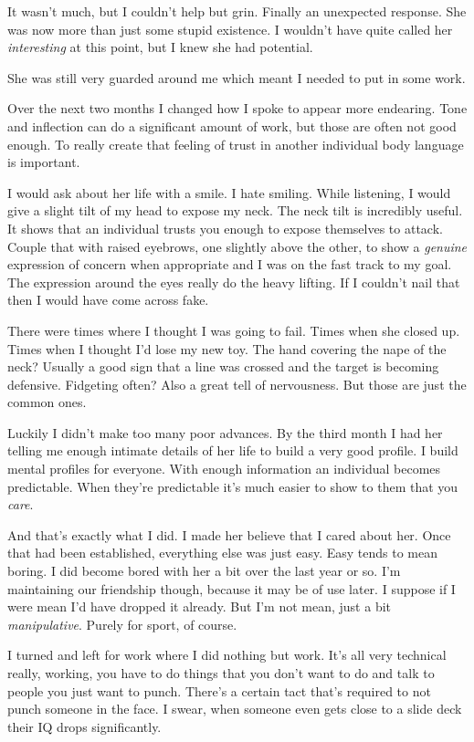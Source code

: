 \noindent
It wasn't much, but I couldn't help but grin.  Finally an unexpected response.
She was now more than just some stupid existence.
I wouldn't have quite called her \textit{interesting} at this point,
but I knew she had potential.
\VV


\noindent
She was still very guarded around me which meant I needed to put in some work.
\VV


\noindent
Over the next two months I changed how I spoke to appear more endearing.
Tone and inflection can do a significant amount of work, but those are often
not good enough.  To really create that feeling of trust in another individual
body language is important.


I would ask about her life with a smile.  I hate smiling.  While listening,
I would give a slight tilt of my head to expose my neck.  The neck tilt is
incredibly useful.  It shows that an individual trusts you enough to
expose themselves to attack. Couple that with raised eyebrows,
one slightly above the other, to show a \textit{genuine} expression of
concern when appropriate and I was on the fast track to my goal.
The expression around the eyes really do the heavy lifting.
If I couldn't nail that then I would have come across fake.


There were times where I thought I was going to fail.  Times when she
closed up.  Times when I thought I'd lose my new toy.
The hand covering the nape of the neck?  Usually a good sign
that a line was crossed and the target is becoming defensive.
Fidgeting often? Also a great tell of nervousness.
But those are just the common ones.


Luckily I didn't make too many poor advances.  By the third month I had her
telling me enough intimate details of her life to build a very good profile.
I build mental profiles for everyone. With enough information
an individual becomes predictable. When they're predictable it's much
easier to show to them that you \textit{care}.


And that's exactly what I did.  I made her believe that I cared about her.
Once that had been established, everything else was just easy.  Easy tends
to mean boring.  I did become bored with her a bit over the last year or so.
I'm maintaining our friendship though, because it may be of use later.
I suppose if I were mean I'd have dropped it already.  But I'm not mean,
just a bit \textit{manipulative}.  Purely for sport, of course.
\VV


\noindent
I turned and left for work where I did nothing but work.
It's all very technical really, working, you have to do
things that you don't want to do and talk to people you
just want to punch.  There's a certain tact that's
required to not punch someone in the face.
I swear, when someone even gets close to a slide deck
their IQ drops significantly.



